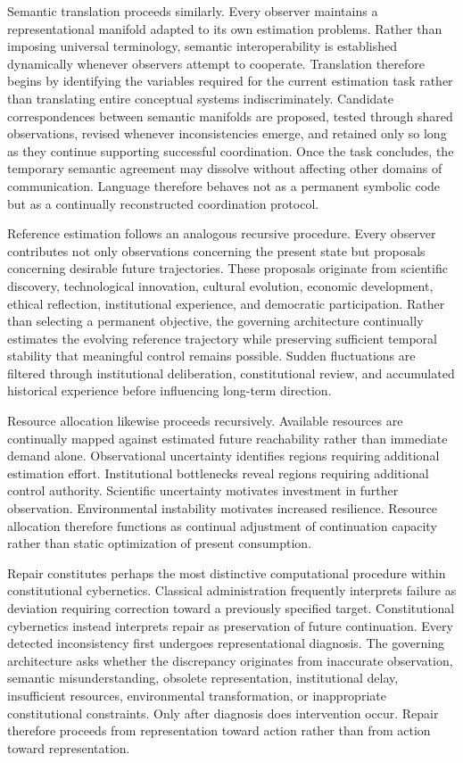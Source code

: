 \documentclass[12pt,a4paper]{article}
\begin{document}
Semantic translation proceeds similarly. Every observer maintains a representational manifold adapted to its own estimation problems. Rather than imposing universal terminology, semantic interoperability is established dynamically whenever observers attempt to cooperate. Translation therefore begins by identifying the variables required for the current estimation task rather than translating entire conceptual systems indiscriminately. Candidate correspondences between semantic manifolds are proposed, tested through shared observations, revised whenever inconsistencies emerge, and retained only so long as they continue supporting successful coordination. Once the task concludes, the temporary semantic agreement may dissolve without affecting other domains of communication. Language therefore behaves not as a permanent symbolic code but as a continually reconstructed coordination protocol.

Reference estimation follows an analogous recursive procedure. Every observer contributes not only observations concerning the present state but proposals concerning desirable future trajectories. These proposals originate from scientific discovery, technological innovation, cultural evolution, economic development, ethical reflection, institutional experience, and democratic participation. Rather than selecting a permanent objective, the governing architecture continually estimates the evolving reference trajectory while preserving sufficient temporal stability that meaningful control remains possible. Sudden fluctuations are filtered through institutional deliberation, constitutional review, and accumulated historical experience before influencing long-term direction.

Resource allocation likewise proceeds recursively. Available resources are continually mapped against estimated future reachability rather than immediate demand alone. Observational uncertainty identifies regions requiring additional estimation effort. Institutional bottlenecks reveal regions requiring additional control authority. Scientific uncertainty motivates investment in further observation. Environmental instability motivates increased resilience. Resource allocation therefore functions as continual adjustment of continuation capacity rather than static optimization of present consumption.

Repair constitutes perhaps the most distinctive computational procedure within constitutional cybernetics. Classical administration frequently interprets failure as deviation requiring correction toward a previously specified target. Constitutional cybernetics instead interprets repair as preservation of future continuation. Every detected inconsistency first undergoes representational diagnosis. The governing architecture asks whether the discrepancy originates from inaccurate observation, semantic misunderstanding, obsolete representation, institutional delay, insufficient resources, environmental transformation, or inappropriate constitutional constraints. Only after diagnosis does intervention occur. Repair therefore proceeds from representation toward action rather than from action toward representation.
\end{document}
